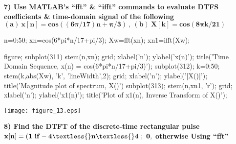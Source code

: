 \documentclass[12pt, onecolumn]{IEEEtran}
\begin{document}
\begin{par}
	\begin{flushleft}
		\textbf{7) Use MATLAB’s “fft” \& “ifft” commands to evaluate DTFS coefficients \& time-domain signal of the following  $\mathbf{(a) \ x[n] = cos( (6\pi/17)n+\pi/3) \ , \ (b) \ X[k] = cos( 8\pi k/21 )}$}
	\end{flushleft}
\end{par}

\begin{matlabcode}
	n=0:50; %
	xn=cos(6*pi*n/17+pi/3); %
	Xw=fft(xn); %
	xn1=ifft(Xw); %
	
	figure; subplot(311)
	stem(n,xn); grid; %
	xlabel('n'); ylabel('x(n)');
	title('Time Domain Sequence, x(n) = cos(6*pi*n/17+pi/3)');
	subplot(312); k=0:50;
	stem(k,abs(Xw), 'k', 'lineWidth',2); grid; %
	xlabel('n'); ylabel('|X(\omega)|');
	title('Magnitude plot of spectrum, X(\omega)')
	subplot(313);
	stem(n,xn1, 'r'); grid; %
	xlabel('n'); ylabel('x1(n)');
	title('Plot of x1(n), Inverse Transform of X(\omega)');
\end{matlabcode}
\begin{center}
	\texttt{[image: figure\_13.eps]}
\end{center}

\begin{par}
	\begin{flushleft}
		\textbf{8) Find the DTFT of the discrete-time rectangular pulse $\mathbf{x[n] = ( 1 \ if -4 \textless{} n \textless{} 4 \ ; \ 0,}$ otherwise Using “fft”}
	\end{flushleft}
\end{par}
\end{document}
